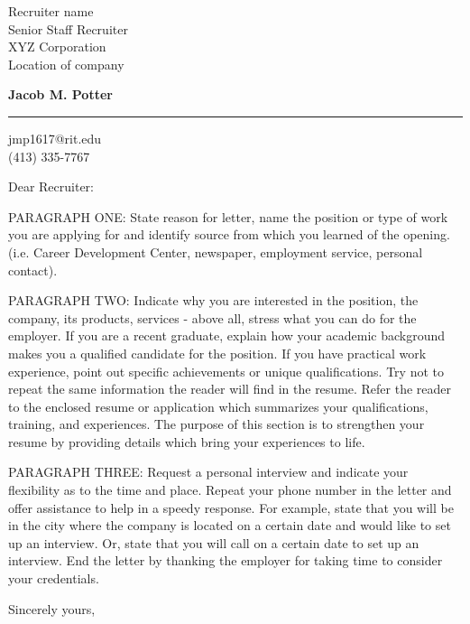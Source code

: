 \documentclass{letter}
\begin{document}
\signature{Jacob M. Potter} 
\longindentation=0pt       
\let\raggedleft\raggedright
 
 
\begin{letter}{Recruiter name\\
Senior Staff Recruiter \\
XYZ Corporation \\
Location of company}


\begin{flushleft}
{\large\bf Jacob M. Potter}
\end{flushleft}
\medskip\hrule height 1pt
\begin{flushright}
\hfill jmp1617@rit.edu\\
\hfill (413) 335-7767
\end{flushright} 
\vfill 

 
\opening{Dear Recruiter:} 
 
\noindent PARAGRAPH ONE: State reason for letter, name the position or type 
of work you are applying for and identify source from  which  you 
learned   of   the  opening.  (i.e.  Career  Development  Center, 
newspaper, employment service, personal contact). 
 
\noindent PARAGRAPH  TWO:  Indicate why you are interested in the position, 
the company, its products, services - above all, stress what  you 
can  do  for  the employer. If you are a recent graduate, explain 
how your academic background makes you a qualified candidate  for 
the  position.  If  you have practical work experience, point out 
specific achievements or unique qualifications. Try not to repeat 
the  same  information  the reader will find in the resume. Refer 
the reader to the enclosed resume or application which summarizes 
your  qualifications,  training,  and experiences. The purpose of 
this section is to strengthen your resume  by  providing  details 
which bring your experiences to life. 
 
\noindent PARAGRAPH THREE: Request a personal interview and  indicate  your 
flexibility as to the time and place. Repeat your phone number in 
the letter and offer assistance to help in a speedy response. For 
example,  state that you will be in the city where the company is 
located on a certain date and would like to set up an  interview. 
Or,  state  that  you  will  call  on a certain date to set up an 
interview. End the letter by thanking  the  employer  for  taking 
time to consider your credentials. 
 
\closing{Sincerely yours,} 
 

 
\encl{} 

\end{letter}
 
\end{document}
